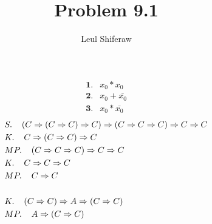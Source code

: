 \documentclass{article}
\title{Problem 9.1}
\author{Leul Shiferaw}
\begin{document}
	\maketitle
	\newpage
	\large
	\begin{align*}
		\textbf{1.}&x_0 * x_0 \\
		\textbf{2.}&x_0 + \bar{x_0}\\
		\textbf{3.}&x_0 * \bar{x_0} 
	\end{align*}
	\begin{align*}
		&S.\hspace{0.4cm} (C \Rightarrow (C \Rightarrow C) \Rightarrow C) \Rightarrow (C \Rightarrow C \Rightarrow C) \Rightarrow C \Rightarrow C\\
		&K. \hspace{0.4cm} C \Rightarrow (C \Rightarrow C) \Rightarrow C \\
		&MP. \hspace{0.4cm} (C \Rightarrow C \Rightarrow C) \Rightarrow C \Rightarrow C \\
		&K.\hspace{0.4cm} C \Rightarrow C \Rightarrow C \\
		&MP. \hspace{0.4cm} C \Rightarrow C \\\\
		&K. \hspace{0.4cm} (C \Rightarrow C) \Rightarrow A \Rightarrow (C \Rightarrow C)\\
		&MP. \hspace{0.4cm} A \Rightarrow (C \Rightarrow C)
	\end{align*}
\end{document}
